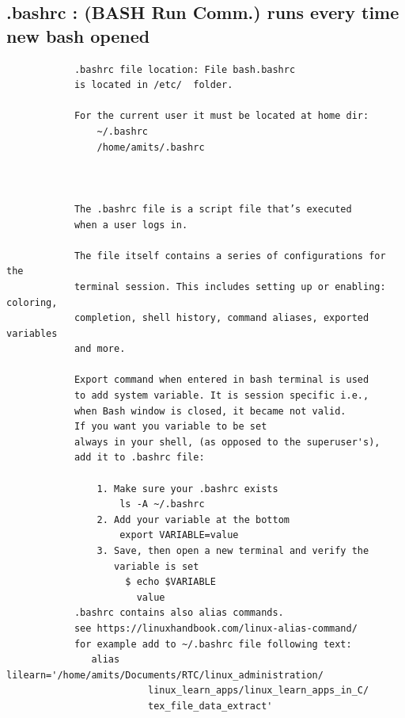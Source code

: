 \documentclass[a4paper,12pt]{article}
\begin{document}
\subsection{.bashrc   : (BASH Run Comm.) runs every time new bash opened}
\begin{verbatim}
            .bashrc file location: File bash.bashrc 
            is located in /etc/  folder.
            
            For the current user it must be located at home dir: 
                ~/.bashrc 
                /home/amits/.bashrc
            
            
            
            The .bashrc file is a script file that’s executed 
            when a user logs in.
            
            The file itself contains a series of configurations for the 
            terminal session. This includes setting up or enabling: coloring, 
            completion, shell history, command aliases, exported variables
            and more.
      
            Export command when entered in bash terminal is used 
            to add system variable. It is session specific i.e.,
            when Bash window is closed, it became not valid. 
            If you want you variable to be set 
            always in your shell, (as opposed to the superuser's), 
            add it to .bashrc file:
      
                1. Make sure your .bashrc exists
		            ls -A ~/.bashrc
                2. Add your variable at the bottom
		            export VARIABLE=value
                3. Save, then open a new terminal and verify the 
                   variable is set
		             $ echo $VARIABLE
		               value      
            .bashrc contains also alias commands.
            see https://linuxhandbook.com/linux-alias-command/
            for example add to ~/.bashrc file following text:
               alias lilearn='/home/amits/Documents/RTC/linux_administration/               
                         linux_learn_apps/linux_learn_apps_in_C/
                         tex_file_data_extract'  
           
\end{verbatim}
\end{document}
